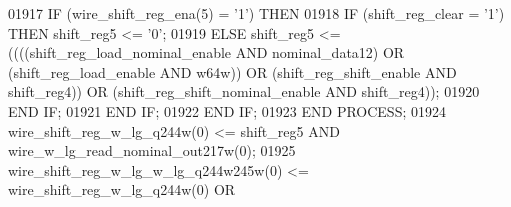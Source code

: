 \begin{DoxyCode}
{01917             \textcolor{keywordflow}{IF} \textcolor{vhdlchar}{(}\textcolor{vhdlchar}{wire_shift_reg_ena}\textcolor{vhdlchar}{(}\textcolor{vhdllogic}{}\textcolor{vhdllogic}{5}\textcolor{vhdlchar}{)} \textcolor{vhdlchar}{=} \textcolor{vhdlchar}{'}\textcolor{vhdllogic}{}\textcolor{vhdllogic}{1}\textcolor{vhdlchar}{'}\textcolor{vhdlchar}{)} \textcolor{keywordflow}{THEN} 
01918                 \textcolor{keywordflow}{IF} \textcolor{vhdlchar}{(}\textcolor{vhdlchar}{shift_reg_clear} \textcolor{vhdlchar}{=} \textcolor{vhdlchar}{'}\textcolor{vhdllogic}{}\textcolor{vhdllogic}{1}\textcolor{vhdlchar}{'}\textcolor{vhdlchar}{)} \textcolor{keywordflow}{THEN} \textcolor{vhdlchar}{shift_reg5} \textcolor{vhdlchar}{<=} \textcolor{vhdlchar}{'}\textcolor{vhdllogic}{}\textcolor{vhdllogic}{0}\textcolor{vhdlchar}{'};
01919                 \textcolor{keywordflow}{ELSE} \textcolor{vhdlchar}{shift_reg5} \textcolor{vhdlchar}{<=} \textcolor{vhdlchar}{(}\textcolor{vhdlchar}{(}\textcolor{vhdlchar}{(}\textcolor{vhdlchar}{(}\textcolor{vhdlchar}{shift_reg_load_nominal_enable} \textcolor{keywordflow}{AND} \textcolor{vhdlchar}{
      nominal_data12}\textcolor{vhdlchar}{)} \textcolor{keywordflow}{OR} \textcolor{vhdlchar}{(}\textcolor{vhdlchar}{shift_reg_load_enable} \textcolor{keywordflow}{AND} \textcolor{vhdlchar}{w64w}\textcolor{vhdlchar}{)}\textcolor{vhdlchar}{)} \textcolor{keywordflow}{OR} \textcolor{vhdlchar}{(}\textcolor{vhdlchar}{shift_reg_shift_enable} \textcolor{keywordflow}{AND} \textcolor{vhdlchar}{
      shift_reg4}\textcolor{vhdlchar}{)}\textcolor{vhdlchar}{)} \textcolor{keywordflow}{OR} \textcolor{vhdlchar}{(}\textcolor{vhdlchar}{shift_reg_shift_nominal_enable} \textcolor{keywordflow}{AND} \textcolor{vhdlchar}{shift_reg4}\textcolor{vhdlchar}{)}\textcolor{vhdlchar}{)};
01920                 \textcolor{keywordflow}{END} \textcolor{keywordflow}{IF};
01921             \textcolor{keywordflow}{END} \textcolor{keywordflow}{IF};
01922         \textcolor{keywordflow}{END} \textcolor{keywordflow}{IF};
01923     \textcolor{keywordflow}{END} \textcolor{keywordflow}{PROCESS};
01924     \textcolor{vhdlchar}{wire_shift_reg_w_lg_q244w}\textcolor{vhdlchar}{(}\textcolor{vhdllogic}{}\textcolor{vhdllogic}{0}\textcolor{vhdlchar}{)} \textcolor{vhdlchar}{<=} \textcolor{vhdlchar}{shift_reg5} \textcolor{keywordflow}{AND} \textcolor{vhdlchar}{
      wire_w_lg_read_nominal_out217w}\textcolor{vhdlchar}{(}\textcolor{vhdllogic}{}\textcolor{vhdllogic}{0}\textcolor{vhdlchar}{)};
01925     \textcolor{vhdlchar}{wire_shift_reg_w_lg_w_lg_q244w245w}\textcolor{vhdlchar}{(}\textcolor{vhdllogic}{}\textcolor{vhdllogic}{0}\textcolor{vhdlchar}{)} \textcolor{vhdlchar}{<=} \textcolor{vhdlchar}{wire_shift_reg_w_lg_q244w}\textcolor{vhdlchar}{(}\textcolor{vhdllogic}{}\textcolor{vhdllogic}{0}\textcolor{vhdlchar}{)} \textcolor{keywordflow}{OR} \textcolor{vhdlchar}{
}}
\end{DoxyCode}
